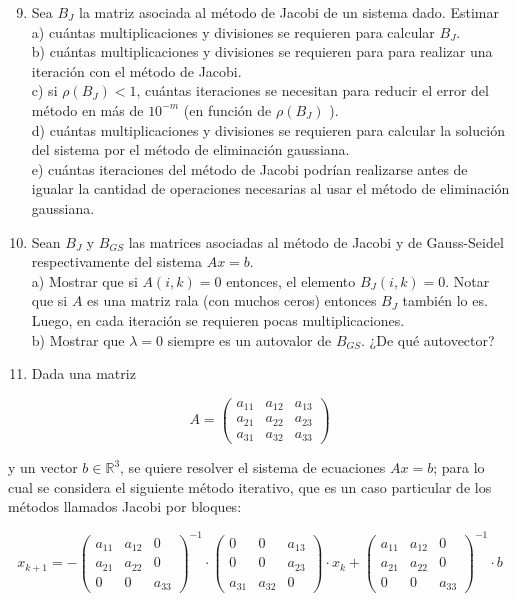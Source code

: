 \documentclass[10pt]{article}
\begin{document}
\begin{enumerate}
  \setcounter{enumi}{8}
  \item Sea $B_{J}$ la matriz asociada al método de Jacobi de un sistema dado. Estimar\\
a) cuántas multiplicaciones y divisiones se requieren para calcular $B_{J}$.\\
b) cuántas multiplicaciones y divisiones se requieren para para realizar una iteración con el método de Jacobi.\\
c) si $\rho\left(B_{J}\right)<1$, cuántas iteraciones se necesitan para reducir el error del método en más de $10^{-m}$ (en función de $\rho\left(B_{J}\right)$ ).\\
d) cuántas multiplicaciones y divisiones se requieren para calcular la solución del sistema por el método de eliminación gaussiana.\\
e) cuántas iteraciones del método de Jacobi podrían realizarse antes de igualar la cantidad de operaciones necesarias al usar el método de eliminación gaussiana.
  \item Sean $B_{J}$ y $B_{G S}$ las matrices asociadas al método de Jacobi y de Gauss-Seidel respectivamente del sistema $A x=b$.\\
a) Mostrar que si $A(i, k)=0$ entonces, el elemento $B_{J}(i, k)=0$. Notar que si $A$ es una matriz rala (con muchos ceros) entonces $B_{J}$ también lo es. Luego, en cada iteración se requieren pocas multiplicaciones.\\
b) Mostrar que $\lambda=0$ siempre es un autovalor de $B_{G S}$. ¿De qué autovector?
  \item Dada una matriz
\end{enumerate}

$$
A=\left(\begin{array}{lll}
a_{11} & a_{12} & a_{13} \\
a_{21} & a_{22} & a_{23} \\
a_{31} & a_{32} & a_{33}
\end{array}\right)
$$

y un vector $b \in \mathbb{R}^{3}$, se quiere resolver el sistema de ecuaciones $A x=b$; para lo cual se considera el siguiente método iterativo, que es un caso particular de los métodos llamados Jacobi por bloques:

$$
x_{k+1}=-\left(\begin{array}{ccc}
a_{11} & a_{12} & 0 \\
a_{21} & a_{22} & 0 \\
0 & 0 & a_{33}
\end{array}\right)^{-1} \cdot\left(\begin{array}{ccc}
0 & 0 & a_{13} \\
0 & 0 & a_{23} \\
a_{31} & a_{32} & 0
\end{array}\right) \cdot x_{k}+\left(\begin{array}{ccc}
a_{11} & a_{12} & 0 \\
a_{21} & a_{22} & 0 \\
0 & 0 & a_{33}
\end{array}\right)^{-1} \cdot b
$$
\end{document}
